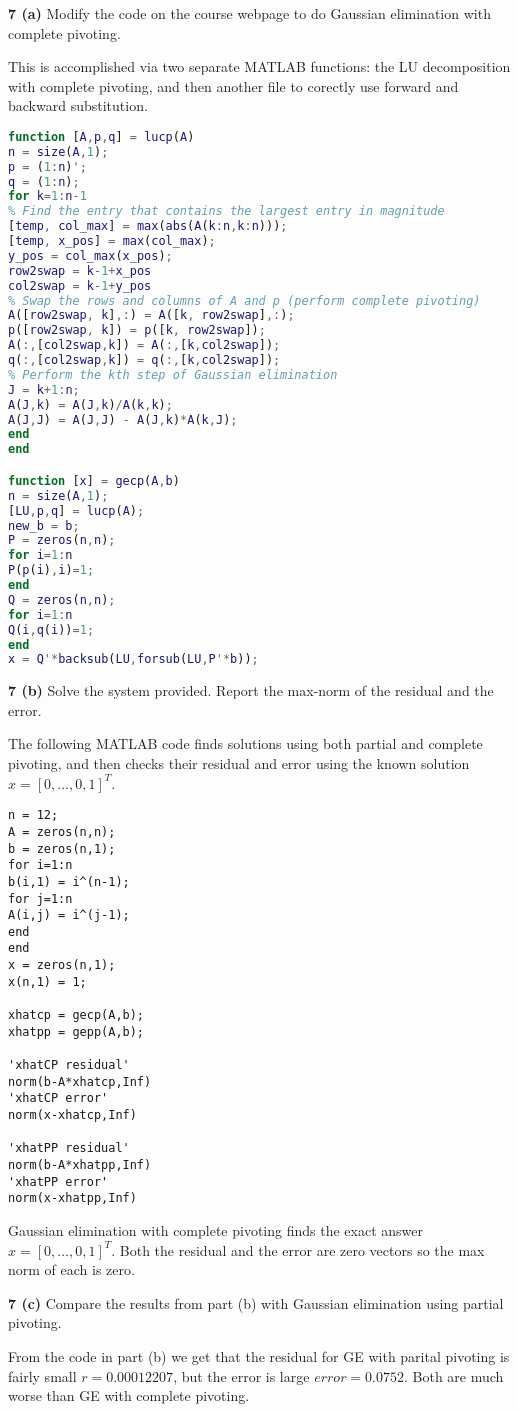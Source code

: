 \documentclass[12pt]{article}
\newcommand{\problem}[1]{\hspace{-4 ex} \large \textbf{#1}}
\begin{document}
\problem{7 (a)} Modify the code on the course webpage to do Gaussian elimination with complete pivoting.

	This is accomplished via two separate MATLAB functions: the LU decomposition with complete pivoting, and then another file to corectly use forward and backward substitution.
	\begin{lstlisting}[language=matlab]
function [A,p,q] = lucp(A)
n = size(A,1);
p = (1:n)';
q = (1:n);
for k=1:n-1
% Find the entry that contains the largest entry in magnitude
[temp, col_max] = max(abs(A(k:n,k:n)));
[temp, x_pos] = max(col_max);
y_pos = col_max(x_pos);
row2swap = k-1+x_pos
col2swap = k-1+y_pos
% Swap the rows and columns of A and p (perform complete pivoting)
A([row2swap, k],:) = A([k, row2swap],:);
p([row2swap, k]) = p([k, row2swap]);
A(:,[col2swap,k]) = A(:,[k,col2swap]);
q(:,[col2swap,k]) = q(:,[k,col2swap]);
% Perform the kth step of Gaussian elimination
J = k+1:n;
A(J,k) = A(J,k)/A(k,k);
A(J,J) = A(J,J) - A(J,k)*A(k,J);
end
end

function [x] = gecp(A,b)
n = size(A,1);
[LU,p,q] = lucp(A);
new_b = b;
P = zeros(n,n);
for i=1:n
P(p(i),i)=1;
end
Q = zeros(n,n);
for i=1:n
Q(i,q(i))=1;
end
x = Q'*backsub(LU,forsub(LU,P'*b));
	\end{lstlisting}
	
\problem{7 (b)} Solve the system provided. Report the max-norm of the residual and the error.

	The following MATLAB code finds solutions using both partial and complete pivoting, and then checks their residual and error using the known solution $x=[0, \dots , 0, 1]^T$.
	\begin{lstlisting}
n = 12;
A = zeros(n,n);
b = zeros(n,1);
for i=1:n
b(i,1) = i^(n-1);
for j=1:n
A(i,j) = i^(j-1);
end
end
x = zeros(n,1);
x(n,1) = 1;

xhatcp = gecp(A,b);
xhatpp = gepp(A,b);

'xhatCP residual'
norm(b-A*xhatcp,Inf)
'xhatCP error'
norm(x-xhatcp,Inf)

'xhatPP residual'
norm(b-A*xhatpp,Inf)
'xhatPP error'
norm(x-xhatpp,Inf)
	\end{lstlisting}
	Gaussian elimination with complete pivoting finds the exact answer $x=[0, \dots , 0, 1]^T$. Both the residual and the error are zero vectors so the max norm of each is zero.
	
\problem{7 (c)} Compare the results from part (b) with Gaussian elimination using partial pivoting.

	From the code in part (b) we get that the residual for GE with parital pivoting is fairly small $r= 0.00012207$, but the error is large $error = 0.0752$. Both are much worse than GE with complete pivoting. 
\end{document}
